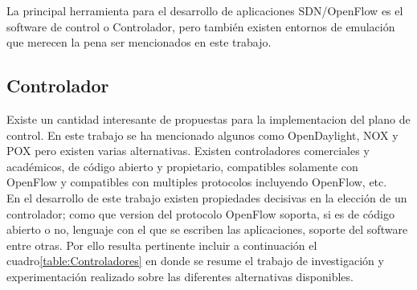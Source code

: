 La principal herramienta para el desarrollo de aplicaciones SDN/OpenFlow es el software de control o Controlador, pero también existen entornos de emulación que merecen la pena ser mencionados en este trabajo.

\subsection{Controlador}
Existe un cantidad interesante de propuestas para la implementacion del plano de control. En este trabajo se ha mencionado algunos como OpenDaylight, NOX y POX pero existen varias alternativas. Existen controladores comerciales y académicos, de código abierto y propietario, compatibles solamente con OpenFlow y compatibles con multiples protocolos incluyendo OpenFlow, etc.\\   

En el desarrollo de este trabajo existen propiedades decisivas en la elecci\'on de un controlador; como que version del protocolo OpenFlow soporta, si es de código abierto o no, lenguaje con el que se escriben las aplicaciones, soporte del software entre otras. Por ello resulta pertinente incluir a continuación el cuadro\ref{table:Controladores} en donde se resume el trabajo de investigación y experimentación realizado sobre las diferentes alternativas disponibles. 

